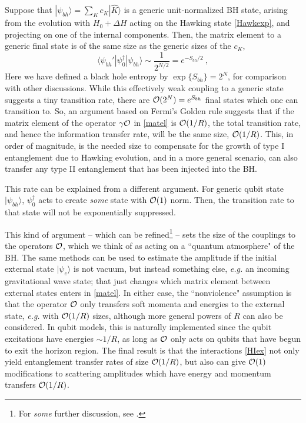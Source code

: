 \documentclass[11pt]{article}
\numberwithin{equation}{section}
\newcommand{\calo}{{\cal O}}
\newcommand{\beq}{\begin{equation}}
\newcommand{\eeq}{\end{equation}}
\begin{document}
Suppose that $|\psi_{bh}\rangle=\sum_K c_K |\hat K\rangle$ is a generic unit-normalized BH state, arising from the evolution with $H_0+\Delta H$ acting on the Hawking state \eqref{Hawkexp}, and projecting on one of the internal components.  Then, the matrix element to a generic final state is of the same size as the generic sizes of the $c_K$,
\beq
\langle\psi_{bh}'| \psi_0^\dagger |\psi_{bh}\rangle \sim \frac{1}{2^{N/2}}=e^{-S_{bh}/2}\ ,
\eeq
Here we have defined a black hole entropy by $\exp\{S_{bh}\}=2^N$, for comparison with other discussions.  While this effectively weak coupling to a generic state suggests  a tiny transition rate, there are $\calo(2^N)=e^{S_{bh}}$ final states which one can transition to.  So, an argument based on Fermi's Golden rule\cite{NVU} suggests that if the matrix element of the operator $\gamma \calo$ in \eqref{matel} is $\calo(1/R)$, the total transition rate, and hence the information transfer rate, will be the same size, $\calo(1/R)$.  This, in order of magnitude, is the needed size to compensate for the growth of type I entanglement due to Hawking evolution, and in a more general scenario, can also transfer any type II entanglement that has been injected into the BH.

This rate can be explained from a different argument.  For generic qubit state $|\psi_{bh}\rangle$, $\psi_0^\dagger$ acts to create {\it some} state with $\calo(1)$ norm.  Then, the transition rate to that state will not be exponentially suppressed.

This kind of argument -- which can be refined\footnote{For {\it some} further discussion, see \cite{GiRo}.} -- sets the size of the couplings to the operators $\calo$, which we think of as acting on a ``quantum atmosphere" of the BH.  The same methods can be used to estimate the amplitude if the initial external state $|\psi_e\rangle$ is not vacuum, but instead something else, {\it e.g.} an incoming gravitational wave state\cite{BHQU}; that just changes which matrix element between external states enters in \eqref{matel}.  In either case, the ``nonviolence" assumption\cite{SGmodels,NVNL,NVUEFT,NVNLT}\cite{NVU,BHQU} is that the operator $\calo$ only transfers soft momenta and energies to the external state, {\it e.g.} with $\calo(1/R)$ sizes, although more general powers of $R$ can also be considered.  In qubit models, this is naturally implemented since the qubit excitations have energies $\sim 1/R$, as long as $\calo$ only acts on qubits that have begun to exit the horizon region.  The final result is that the interactions \eqref{HIex} not only yield entanglement transfer rates of size $\calo(1/R)$, but also 
can give $\calo(1)$ modifications to scattering amplitudes which have energy and momentum transfers $\calo(1/R)$.  
\end{document}
